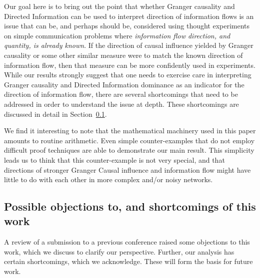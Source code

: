 \documentclass[letterpaper, 10pt, conference]{ieeeconf}
\begin{document}
Our goal here is to bring out the point that whether Granger causality and Directed Information can be used to interpret direction of information flows is an issue that can be, and perhaps should be, considered using thought experiments on simple communication problems where \emph{information flow direction, and quantity, is already known}. If the direction of causal influence yielded by Granger causality or some other similar measure were to match the known direction of information flow, then that measure can be more confidently used in experiments. While our results strongly suggest that one needs to exercise care in interpreting Granger causality and Directed Information dominance as an indicator for the direction of information flow, there are several shortcomings that need to be addressed in order to understand the issue at depth. These shortcomings are discussed in detail in Section~\ref{sec:objections-and-shortcomings}.

We find it interesting to note that the mathematical machinery used in this paper amounts to routine arithmetic. Even simple counter-examples that do not employ difficult proof techniques are able to demonstrate our main result. This simplicity leads us to think that this counter-example is not very special, and that directions of stronger Granger Causal influence and information flow might have little to do with each other in more complex and/or noisy networks.


\subsection{Possible objections to, and shortcomings of this work}
\label{sec:objections-and-shortcomings}

A review of a submission to a previous conference raised some objections to this work, which we discuss to clarify our perspective. Further, our analysis has certain shortcomings, which we acknowledge. These will form the basis for future work.
\end{document}
